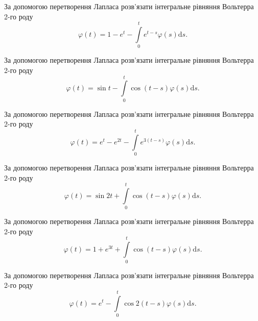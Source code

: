 \documentclass[12pt]{extarticle}
\begin{document}
\begin{Exercise}
За допомогою перетворення Лапласа розв’язати інтегральне рівняння Вольтерра 2-го роду \[\varphi(t) = 1 - e^{t} - \int\limits_{0}^{t} e^{t - s} \varphi(s) \mathrm{d}s.\]
\end{Exercise}

\begin{Exercise}
За допомогою перетворення Лапласа розв’язати інтегральне рівняння Вольтерра 2-го роду \[\varphi(t) = \sin t - \int\limits_{0}^{t} \cos (t - s) \varphi(s) \mathrm{d}s.\]
\end{Exercise}

\begin{Exercise}
За допомогою перетворення Лапласа розв’язати інтегральне рівняння Вольтерра 2-го роду \[\varphi(t) = e^{t} - e^{2t} - \int\limits_{0}^{t} e^{3(t - s)} \varphi(s) \mathrm{d}s.\]
\end{Exercise}

\begin{Exercise}
За допомогою перетворення Лапласа розв’язати інтегральне рівняння Вольтерра 2-го роду \[\varphi(t) = \sin 2 t + \int\limits_{0}^{t} \cos (t - s) \varphi(s) \mathrm{d}s.\]
\end{Exercise}

\begin{Exercise}
За допомогою перетворення Лапласа розв’язати інтегральне рівняння Вольтерра 2-го роду \[\varphi(t) = 1 + e^{3t} + \int\limits_{0}^{t} \cos (t - s) \varphi(s) \mathrm{d}s.\]
\end{Exercise}

\begin{Exercise}
За допомогою перетворення Лапласа розв’язати інтегральне рівняння Вольтерра 2-го роду \[\varphi(t) = e^{t} - \int\limits_{0}^{t} \cos 2(t - s) \varphi(s) \mathrm{d}s.\]
\end{Exercise}
\end{document}
